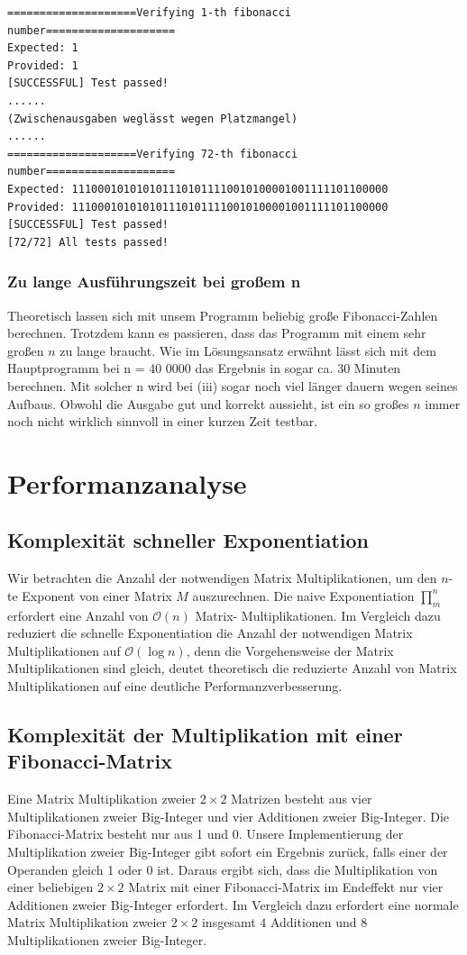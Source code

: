 \documentclass[course=erap]{aspdoc}
\begin{document}
\begin{lstlisting}[caption={Beispiel Testausgabe von Induktion Check mit start = 1, end = 72, v = 0 }]
====================Verifying 1-th fibonacci number====================
Expected: 1
Provided: 1
[SUCCESSFUL] Test passed!
......
(Zwischenausgaben weglässt wegen Platzmangel)
......
====================Verifying 72-th fibonacci number====================
Expected: 1110001010101011101011110010100001001111101100000
Provided: 1110001010101011101011110010100001001111101100000
[SUCCESSFUL] Test passed!
[72/72] All tests passed!
\end{lstlisting}

\subsubsection{Zu lange Ausführungszeit bei großem n}
Theoretisch lassen sich mit unsem Programm beliebig große Fibonacci-Zahlen berechnen. Trotzdem kann es passieren, dass das Programm mit einem sehr großen $n$ zu lange braucht. Wie im Lösungsansatz erwähnt lässt sich mit dem Hauptprogramm bei n = 40 0000 das Ergebnis in sogar ca. 30 Minuten berechnen. Mit solcher n wird bei (iii) sogar noch viel länger dauern wegen seines Aufbaus. Obwohl die Ausgabe gut und korrekt aussieht, ist ein so großes $n$ immer noch nicht wirklich sinnvoll in einer kurzen Zeit testbar.

\section{Performanzanalyse}
\subsection{Komplexität schneller Exponentiation}
Wir betrachten die Anzahl der notwendigen Matrix Multiplikationen, um den $n$-te Exponent von einer Matrix $M$ auszurechnen. Die naive Exponentiation $\prod _{m}^{n}$ erfordert eine Anzahl von $\mathcal{O}(n)$ Matrix- Multiplikationen. Im Vergleich dazu reduziert die schnelle Exponentiation die Anzahl der notwendigen Matrix Multiplikationen auf $\mathcal{O}(\log n)$, denn die Vorgehensweise der Matrix Multiplikationen sind gleich, deutet theoretisch die reduzierte Anzahl von Matrix Multiplikationen auf eine deutliche Performanzverbesserung.
\subsection{Komplexität der Multiplikation mit einer Fibonacci-Matrix}
Eine Matrix Multiplikation zweier $2\times2$ Matrizen besteht aus vier Multiplikationen zweier Big-Integer und vier Additionen zweier Big-Integer. Die Fibonacci-Matrix besteht nur aus 1 und 0. Unsere Implementierung der Multiplikation zweier Big-Integer gibt sofort ein Ergebnis zurück, falls einer der Operanden gleich 1 oder 0 ist. Daraus ergibt sich, dass die Multiplikation von einer beliebigen $2\times2$ Matrix mit einer Fibonacci-Matrix im Endeffekt nur vier Additionen zweier Big-Integer erfordert. Im Vergleich dazu erfordert eine normale Matrix Multiplikation zweier $2\times2$ insgesamt $4$ Additionen und $8$ Multiplikationen zweier Big-Integer.
\end{document}
